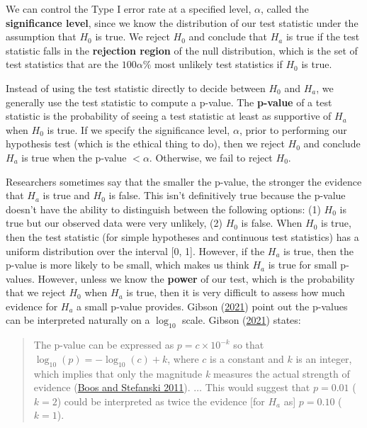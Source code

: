 \documentclass[
]{book}
\theoremstyle{definition}
\theoremstyle{definition}
\theoremstyle{definition}
\theoremstyle{definition}
\theoremstyle{remark}
\begin{document}
We can control the Type I error rate at a specified level, \(\alpha\), called the \textbf{significance level}, since we know the distribution of our test statistic under the assumption that \(H_0\) is true. We reject \(H_0\) and conclude that \(H_a\) is true if the test statistic falls in the \textbf{rejection region} of the null distribution, which is the set of test statistics that are the \(100\alpha\%\) most unlikely test statistics if \(H_0\) is true.

Instead of using the test statistic directly to decide between \(H_0\) and \(H_a\), we generally use the test statistic to compute a p-value. The \textbf{p-value} of a test statistic is the probability of seeing a test statistic at least as supportive of \(H_a\) when \(H_0\) is true. If we specify the significance level, \(\alpha\), prior to performing our hypothesis test (which is the ethical thing to do), then we reject \(H_0\) and conclude \(H_a\) is true when the p-value \(<\alpha\). Otherwise, we fail to reject \(H_0\).

Researchers sometimes say that the smaller the p-value, the stronger the
evidence that \(H_a\) is true and \(H_0\) is false. This isn't definitively
true because the p-value doesn't have the ability to distinguish between the following options: (1) \(H_0\) is true but our observed data were very unlikely, (2) \(H_0\) is
false. When \(H_0\) is true, then the test statistic (for simple hypotheses and continuous test statistics) has a uniform distribution over the interval {[}0, 1{]}. However, if the \(H_a\) is true, then the p-value is more
likely to be small, which makes us think \(H_a\) is true for small
p-values. However, unless we know the \textbf{power} of our test, which is
the probability that we reject \(H_0\) when \(H_a\) is true, then it is very
difficult to assess how much evidence for \(H_a\) a small p-value
provides. Gibson (\protect\hyperlink{ref-gibson_pvalue}{2021}) point out the p-values can be
interpreted naturally on a \(\log_{10}\) scale. Gibson (\protect\hyperlink{ref-gibson_pvalue}{2021}) states:

\begin{quote}
The p-value can be expressed as \(p=c\times 10^{-k}\) so that
\(\log_{10}(p)=-\log_{10}(c)+k\), where \(c\) is a constant and \(k\) is an
integer, which implies that only the magnitude \emph{k} measures the actual
strength of evidence (\protect\hyperlink{ref-boos_stefanski_2011_pvalues}{Boos and Stefanski 2011}). \(\ldots\) This
would suggest that \(p=0.01\) (\(k=2\)) could be interpreted as twice the
evidence {[}for \(H_a\) as{]} \(p=0.10\) (\(k=1\)).
\end{quote}
\end{document}
